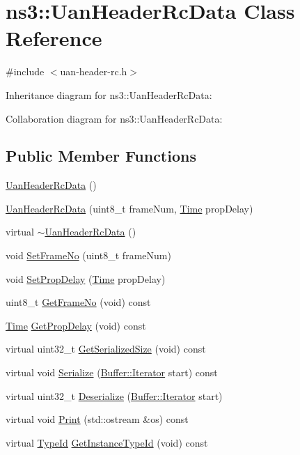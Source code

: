 \hypertarget{classns3_1_1UanHeaderRcData}{}\section{ns3\+:\+:Uan\+Header\+Rc\+Data Class Reference}
\label{classns3_1_1UanHeaderRcData}


{\ttfamily \#include $<$uan-\/header-\/rc.\+h$>$}



Inheritance diagram for ns3\+:\+:Uan\+Header\+Rc\+Data\+:


Collaboration diagram for ns3\+:\+:Uan\+Header\+Rc\+Data\+:
\subsection*{Public Member Functions}
\begin{DoxyCompactItemize}
\item 
\hyperlink{classns3_1_1UanHeaderRcData_a56cd073bc118c2e14e255f5fb71c9ff1}{Uan\+Header\+Rc\+Data} ()
\item 
\hyperlink{classns3_1_1UanHeaderRcData_abb2a8847d258a42ba76b304320594b45}{Uan\+Header\+Rc\+Data} (uint8\+\_\+t frame\+Num, \hyperlink{classns3_1_1Time}{Time} prop\+Delay)
\item 
virtual \hyperlink{classns3_1_1UanHeaderRcData_a9d33291b2992e895f98f739fde761a40}{$\sim$\+Uan\+Header\+Rc\+Data} ()
\item 
void \hyperlink{classns3_1_1UanHeaderRcData_a54f9584d1cece8956b64bfaef36af24c}{Set\+Frame\+No} (uint8\+\_\+t frame\+Num)
\item 
void \hyperlink{classns3_1_1UanHeaderRcData_aa78676a66ec9f0d1c43e66bd1c5b182b}{Set\+Prop\+Delay} (\hyperlink{classns3_1_1Time}{Time} prop\+Delay)
\item 
uint8\+\_\+t \hyperlink{classns3_1_1UanHeaderRcData_a3f31e755923c6d7002bd8842e6695e19}{Get\+Frame\+No} (void) const 
\item 
\hyperlink{classns3_1_1Time}{Time} \hyperlink{classns3_1_1UanHeaderRcData_ad0f88a7d82e59a5de31d215a0ee8d525}{Get\+Prop\+Delay} (void) const 
\item 
virtual uint32\+\_\+t \hyperlink{classns3_1_1UanHeaderRcData_a5a754a45be5766d658771d87dc1500f6}{Get\+Serialized\+Size} (void) const 
\item 
virtual void \hyperlink{classns3_1_1UanHeaderRcData_a67cd92d16e9df8df30375e572b62a111}{Serialize} (\hyperlink{classns3_1_1Buffer_1_1Iterator}{Buffer\+::\+Iterator} start) const 
\item 
virtual uint32\+\_\+t \hyperlink{classns3_1_1UanHeaderRcData_aaf625fdde6c76e26dbd2a82438514011}{Deserialize} (\hyperlink{classns3_1_1Buffer_1_1Iterator}{Buffer\+::\+Iterator} start)
\item 
virtual void \hyperlink{classns3_1_1UanHeaderRcData_a1d968a4f3012838bc2f73301581f126b}{Print} (std\+::ostream \&os) const 
\item 
virtual \hyperlink{classns3_1_1TypeId}{Type\+Id} \hyperlink{classns3_1_1UanHeaderRcData_aa5d6a1a1006bdd1b14421d350321cfdd}{Get\+Instance\+Type\+Id} (void) const 
\end{DoxyCompactItemize}

